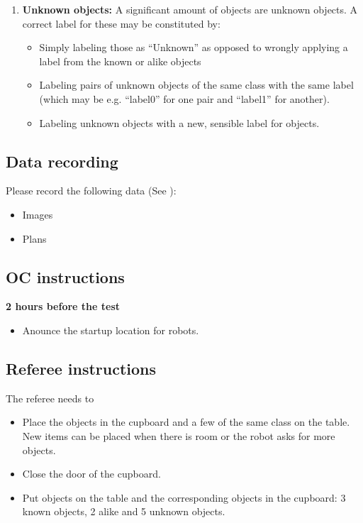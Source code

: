 \begin{enumerate}
  \item \textbf{Unknown objects:} A significant amount of objects are unknown objects. A correct label for these may be constituted by: 
  \begin{itemize}
   \item Simply labeling those as ``Unknown'' as opposed to wrongly applying a label from the known or alike objects
   \item Labeling pairs of unknown objects of the same class with the same label (which may be e.g. ``label0'' for one pair and ``label1'' for another). 
   \item Labeling unknown objects with a new, sensible label for objects.
  \end{itemize}
\end{enumerate}

\subsection{Data recording}
  Please record the following data (See ):
  \begin{itemize}
   \item Images
   \item Plans
  \end{itemize}

\subsection{OC instructions}

\textbf{2 hours before the test}
\begin{itemize}
    \item Anounce the startup location for robots.
\end{itemize}

\subsection{Referee instructions}
The referee needs to
\begin{itemize}
\item Place the objects in the cupboard and a few of the same class on the table. New items can be placed when there is room or the robot asks for more objects. 
\item Close the door of the cupboard. 
\item Put objects on the table and the corresponding objects in the cupboard: 3 known objects, 2 alike and 5 unknown objects. 
\end{itemize}

